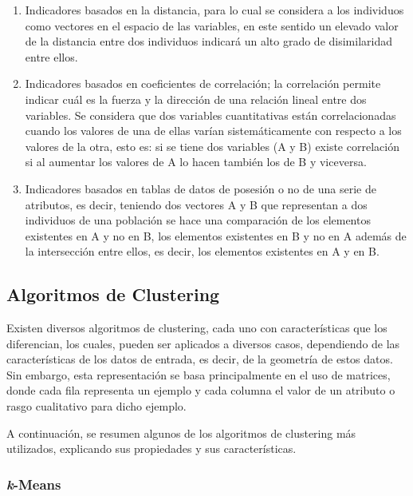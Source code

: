 \begin{enumerate}
	
	\item Indicadores basados en la distancia, para lo cual se considera a los individuos como vectores en el espacio de las variables, en este sentido un elevado valor de la distancia entre dos individuos indicará un alto grado de disimilaridad entre ellos.
	
	\item Indicadores basados en coeficientes de correlación; la correlación permite indicar cuál es la fuerza y la dirección de una relación lineal entre dos variables. Se considera que dos variables cuantitativas están correlacionadas cuando los valores de una de ellas varían sistemáticamente con respecto a los valores de la otra, esto es: si se tiene dos variables (A y B) existe correlación si al aumentar los valores de A lo hacen también los de B y viceversa.
	
	\item Indicadores basados en tablas de datos de posesión o no de una serie de atributos, es decir, teniendo dos vectores A y B que representan a dos individuos de una población se hace una comparación de los elementos existentes en A y no en B, los elementos existentes en B y no en A además de la intersección entre ellos, es decir, los elementos existentes en A y en B. 
	
\end{enumerate}

\subsection{Algoritmos de Clustering}

Existen diversos algoritmos de clustering, cada uno con características que los diferencian, los cuales, pueden ser aplicados a diversos casos, dependiendo de las características de los datos de entrada, es decir, de la geometría de estos datos. Sin embargo, esta representación se basa principalmente en el uso de matrices, donde cada fila representa un ejemplo y cada columna el valor de un atributo o rasgo cualitativo para dicho ejemplo.

A continuación, se resumen algunos de los algoritmos de clustering más utilizados, explicando sus propiedades y sus características.

\subsubsection{\textit{k}-Means}

